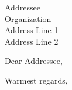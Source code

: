 \documentclass[12pt]{letter}
\begin{document}
\begin{letter}{ Addressee \\ Organization \\ Address Line 1 \\ Address Line 2 }

	\opening{Dear Addressee,}

	\closing{Warmest regards,}

\end{letter}
\end{document}
